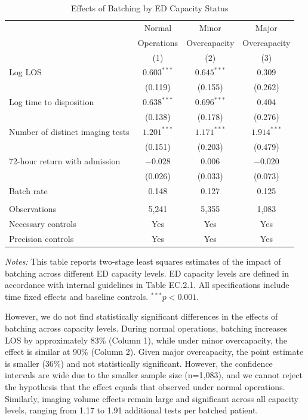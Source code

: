 \documentclass[,,blindrev]{informs}
\begin{document}
\begin{table}[t!]
\centering
\caption{Effects of Batching by ED Capacity Status}
\label{tab:het_effects}
\begin{threeparttable}
\begin{tabular}{lccc}
\toprule
& Normal & Minor & Major \\ 
& Operations & Overcapacity & Overcapacity \\ 
& (1) & (2) & (3) \\ 
\midrule

Log LOS 
& $0.603^{***}$ & $0.645^{***}$ & 0.309 \\ 
& (0.119) & (0.155) & (0.262) \\[0.75em] 

Log time to disposition 
& $0.638^{***}$ & $0.696^{***}$ & 0.404 \\ 
& (0.138) & (0.178) & (0.276) \\[0.75em] 

Number of distinct imaging tests 
& $1.201^{***}$ & $1.171^{***}$ & $1.914^{***}$ \\ 
& (0.151) & (0.203) & (0.479) \\[0.75em] 

72-hour return with admission 
& $-0.028$ & 0.006 & $-0.020$ \\ 
& (0.026) & (0.033) & (0.073) \\[0.75em] 
\midrule
Batch rate & 0.148 & 0.127 & 0.125 \\[0.5em]
\\
Observations 
& 5,241 & 5,355 & 1,083 \\ 

Necessary controls & Yes & Yes & Yes \\ 
Precision controls & Yes & Yes & Yes \\ 
\bottomrule
\end{tabular}

\begin{flushleft}
\footnotesize
\textit{Notes:} This table reports two-stage least squares estimates of the impact of batching across different ED capacity levels. ED capacity levels are defined in accordance with internal guidelines in Table EC.2.1. All specifications include time fixed effects and baseline controls. 
$^{***}p<0.001$.
\end{flushleft}
\end{threeparttable}
\end{table}

However, we do not find statistically significant differences in the
effects of batching across capacity levels. During normal operations,
batching increases LOS by approximately 83\% (Column 1), while under
minor overcapacity, the effect is similar at 90\% (Column 2). Given
major overcapacity, the point estimate is smaller (36\%) and not
statistically significant. However, the confidence intervals are wide
due to the smaller sample size (n=1,083), and we cannot reject the
hypothesis that the effect equals that observed under normal operations.
Similarly, imaging volume effects remain large and significant across
all capacity levels, ranging from 1.17 to 1.91 additional tests per
batched patient.
\end{document}
